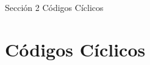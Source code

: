 \documentclass{beamer}
\theoremstyle{plain}
\theoremstyle{example}
\newtheorem{ejercicio} [Ejercicio]{Ejercicio}
\theoremstyle{example}
\begin{document}











\begin{frame}   \footnotesize
{
\begin{block}{Sección 2}
Códigos Cíclicos
\end{block}
}
\end{frame} 
\section{Códigos Cíclicos}
\end{document}
